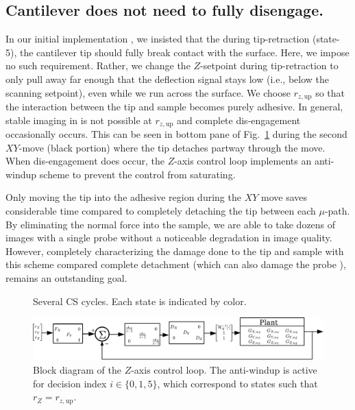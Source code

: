\documentclass[twocolumn,oneside]{IEEEtran/IEEEtran}
\newcommand{\rzup}{\ensuremath{r_{z,\textrm{up}}}\xspace}
\begin{document}
\subsection{Cantilever does not need to fully disengage.}
In our initial implementation \cite{braker_hardware_2018}, we insisted that the during
tip-retraction (state-5), the cantilever tip should fully break
contact with the surface. Here, we impose no such requirement. Rather,
we change the $Z$-setpoint during tip-retraction to only pull away far
enough that the deflection signal stays low (i.e., below the scanning
setpoint), even while we run across the surface. We choose \rzup so
that the interaction between the tip and sample becomes purely
adhesive. In general, stable imaging in is not possible at \rzup and
complete dis-engagement occasionally occurs. This can be seen in bottom pane of
Fig.~\ref{fig:cs_cycle} during the second $XY$-move (black portion) where the tip detaches partway through the move.
When dis-engagement does occur, the $Z$-axis control loop implements an anti-windup scheme to prevent the control from saturating.


Only moving the tip into the adhesive region during the $XY$ move saves considerable time
compared to completely detaching the tip between each $\mu$-path. By eliminating the normal force into the sample, we are able to take dozens of images with a single probe without a noticeable degradation in image quality. However, completely characterizing the damage done to the tip and sample with this scheme compared complete detachment (which can also damage the probe \cite{meyer_atomic_1992}), remains an outstanding goal.

\begin{figure}[t!]
  \centering 
  \caption{Several CS cycles. Each state is indicated by color.}
  \label{fig:cs_cycle}
\end{figure}

\begin{figure}[ht!]
  \centering
  \includegraphics[width=1\textwidth]{figures/AFM_loop_xyz.pdf}
  \caption{Block diagram of the $Z$-axis control loop. The anti-windup
    is active for decision index $i\in\{0,1,5\}$, which correspond to
    states such that $r_Z=\rzup$.}
  \label{fig:afm_bd_dinv}
\end{figure}
\end{document}
